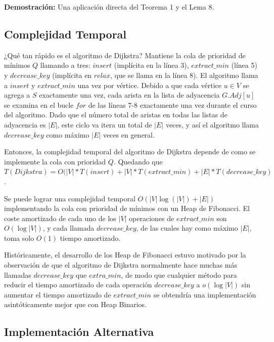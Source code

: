 \documentclass[12pt]{article}
\newcommand{\proof}{\textbf{Demostración:} }
\newcommand{\nl}{\vspace{0.3cm}}
\begin{document}
\proof Una aplicación directa del Teorema 1 y el Lema 8.

\subsection{Complejidad Temporal}

¿Qué tan rápido es el algoritmo de Dijkstra? Mantiene la cola de prioridad de mínimos $Q$ llamando a tres: $insert$ (implícita en la línea 3), $extract\_min$ (línea 5) y $decrease\_key$ (implícita en $relax$, que se llama en la línea 8). El algoritmo llama a $insert$ y $extract\_min$ una vez por vértice. Debido a que cada vértice $u \in V$ se agrega a $S$ exactamente una vez, cada arista en la lista de adyacencia $G.Adj [u]$ se examina en el bucle $for$ de las líneas 7-8 exactamente una vez durante el curso del algoritmo. Dado que el número total de aristas en todas las listas de adyacencia es $|E|$, este ciclo va itera un total de $|E|$ veces, y así el algoritmo llama $decrease\_key$ como máximo $|E|$ veces en general.

\nl

Entonces, la complejidad temporal del algoritmo de Dijkstra depende de como se implemente la cola con prioridad $Q$. Quedando que $T(Dijkstra) = O(|V| * T(insert) + |V| * T(extract\_min) + |E| * T(decrease\_key)$.

\nl

Se puede lograr una complejidad temporal  $O(|V| \log(|V|) + |E|)$ implementando la cola con prioridad de mínimos con un Heap de Fibonacci. El coste amortizado de cada uno de los $|V|$ operaciones de $extract\_min$ son $O(\log|V|)$, y cada llamada $decrease\_key$, de las cuales hay como máximo $|E|$, toma solo $O(1)$ tiempo amortizado.

\nl

Históricamente, el desarrollo de los Heap de Fibonacci estuvo motivado por la observación de que el algoritmo de Dijkstra normalmente hace muchas más llamadas $decrease\_key$ que $extra\_min$, de modo que cualquier método para reducir el tiempo amortizado de cada operación $decrease\_key$ a $o(\log|V|)$ sin aumentar el tiempo amortizado de $extract\_min$ se obtendría una implementación asintóticamente mejor que con Heap Binarios.

\subsection{Implementación Alternativa}


\end{document}

